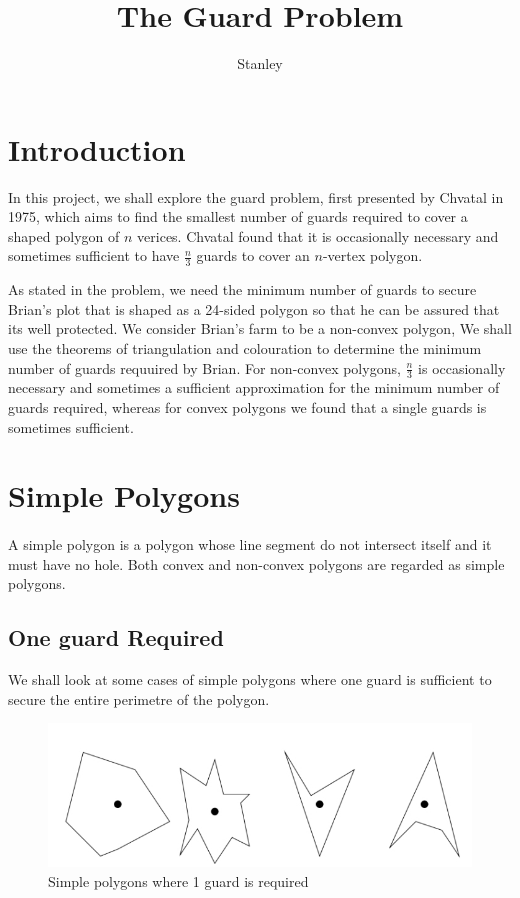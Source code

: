 \documentclass[10pt,a4paper]{article}
\author{Stanley}
\title{The Guard Problem}
\begin{document}
\maketitle
\tableofcontents
\newpage

\section{Introduction}
\quad In this project, we shall explore the guard problem, first presented by Chvatal in 1975\cite{ref1}, which aims to find the smallest number of guards required to cover a shaped polygon of $n$ verices. Chvatal found that it is occasionally necessary and sometimes sufficient to have $\frac{n}{3}$ guards to cover an $n$-vertex polygon. 

\quad As stated in the problem, we need the minimum number of guards to secure Brian's plot that is shaped as a 24-sided polygon so that he can be assured that its well protected. We consider Brian's farm to be a non-convex polygon, We shall use the theorems of triangulation and colouration to determine the minimum number of guards requuired by Brian. For non-convex polygons, $\frac{n}{3}$ is occasionally necessary and sometimes a sufficient approximation for the minimum number of guards required, whereas for convex polygons we found that a single guards is sometimes sufficient.
\newpage


\section{Simple Polygons}
\paragraph{}
A simple polygon is a polygon  whose line segment do not intersect  itself and it must have no hole. Both convex and non-convex polygons are regarded as simple polygons.

\subsection{One guard Required}
We shall look at some cases of simple polygons where one guard is sufficient to secure the entire perimetre of the polygon.



\begin{figure}[h!]\label{1guard}
\centering
\includegraphics[scale=0.5]{1.jpg}
\caption{Simple polygons where 1 guard is required}
\end{figure}
\end{document}
